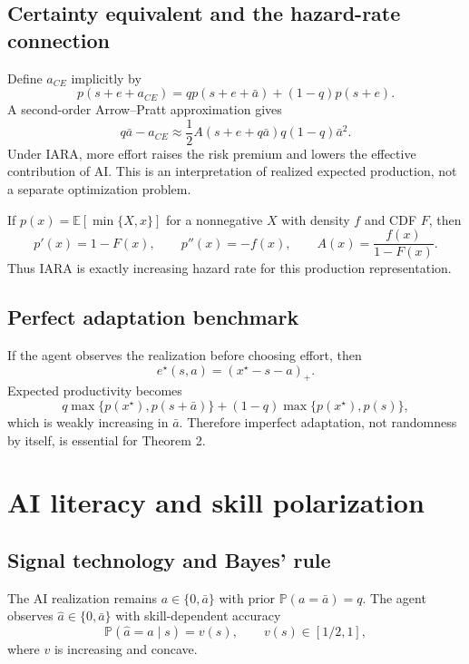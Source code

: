 \documentclass[11pt]{article}
\theoremstyle{tutorial}
\theoremstyle{remark}
\newcommand{\E}{\mathbb{E}}
\newcommand{\Pp}{\mathbb{P}}
\newcommand{\1}{\mathbb{I}}
\newcommand{\pos}[1]{\left(#1\right)_{+}}
\begin{document}
\subsection{Certainty equivalent and the hazard-rate connection}

Define $a_{CE}$ implicitly by
\[
p(s+e+a_{CE})=q p(s+e+\bar a)+(1-q)p(s+e).
\]
A second-order Arrow--Pratt approximation gives
\[
q\bar a-a_{CE}\approx
\frac12 A(s+e+q\bar a)q(1-q)\bar a^2.
\]
Under IARA, more effort raises the risk premium and lowers the effective contribution of AI.  This is an
interpretation of realized expected production, not a separate optimization problem.

If $p(x)=\E[\min\{X,x\}]$ for a nonnegative $X$ with density $f$ and CDF $F$, then
\[
p'(x)=1-F(x),\qquad p''(x)=-f(x),\qquad
A(x)=\frac{f(x)}{1-F(x)}.
\]
Thus IARA is exactly increasing hazard rate for this production representation.

\subsection{Perfect adaptation benchmark}

If the agent observes the realization before choosing effort, then
\[
e^\star(s,a)=\pos{x^\star-s-a}.
\]
Expected productivity becomes
\[
q\max\{p(x^\star),p(s+\bar a)\}+(1-q)\max\{p(x^\star),p(s)\},
\]
which is weakly increasing in $\bar a$.  Therefore imperfect adaptation, not randomness by itself, is
essential for Theorem 2.

\section{AI literacy and skill polarization}

\subsection{Signal technology and Bayes' rule}

The AI realization remains $a\in\{0,\bar a\}$ with prior $\Pp(a=\bar a)=q$.  The agent observes
$\hat a\in\{0,\bar a\}$ with skill-dependent accuracy
\[
\Pp(\hat a=a\mid s)=v(s),
\qquad v(s)\in[1/2,1],
\]
where $v$ is increasing and concave.
\end{document}
